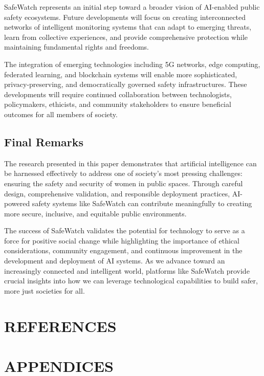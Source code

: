 \documentclass[12pt,a4paper]{article}
\begin{document}
SafeWatch represents an initial step toward a broader vision of AI-enabled public safety ecosystems. Future developments will focus on creating interconnected networks of intelligent monitoring systems that can adapt to emerging threats, learn from collective experiences, and provide comprehensive protection while maintaining fundamental rights and freedoms.

The integration of emerging technologies including 5G networks, edge computing, federated learning, and blockchain systems will enable more sophisticated, privacy-preserving, and democratically governed safety infrastructures. These developments will require continued collaboration between technologists, policymakers, ethicists, and community stakeholders to ensure beneficial outcomes for all members of society.

\subsection{Final Remarks}

The research presented in this paper demonstrates that artificial intelligence can be harnessed effectively to address one of society's most pressing challenges: ensuring the safety and security of women in public spaces. Through careful design, comprehensive validation, and responsible deployment practices, AI-powered safety systems like SafeWatch can contribute meaningfully to creating more secure, inclusive, and equitable public environments.

The success of SafeWatch validates the potential for technology to serve as a force for positive social change while highlighting the importance of ethical considerations, community engagement, and continuous improvement in the development and deployment of AI systems. As we advance toward an increasingly connected and intelligent world, platforms like SafeWatch provide crucial insights into how we can leverage technological capabilities to build safer, more just societies for all.

\newpage
\section{REFERENCES}




\newpage

\section*{APPENDICES}
\end{document}

